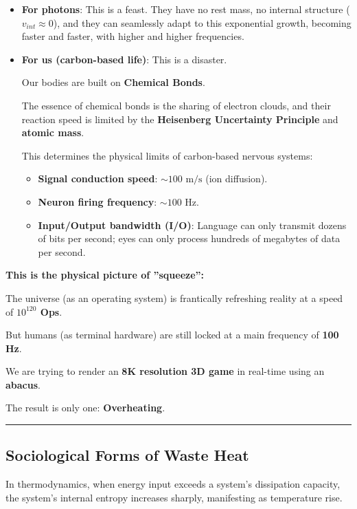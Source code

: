 \begin{itemize}
\item \textbf{For photons}: This is a feast. They have no rest mass, no internal structure ($v_{int} \approx 0$), and they can seamlessly adapt to this exponential growth, becoming faster and faster, with higher and higher frequencies.

\item \textbf{For us (carbon-based life)}: This is a disaster.

Our bodies are built on \textbf{Chemical Bonds}.

The essence of chemical bonds is the sharing of electron clouds, and their reaction speed is limited by the \textbf{Heisenberg Uncertainty Principle} and \textbf{atomic mass}.

This determines the physical limits of carbon-based nervous systems:

\begin{itemize}
\item \textbf{Signal conduction speed}: $\sim 100 \text{ m/s}$ (ion diffusion).

\item \textbf{Neuron firing frequency}: $\sim 100 \text{ Hz}$.

\item \textbf{Input/Output bandwidth (I/O)}: Language can only transmit dozens of bits per second; eyes can only process hundreds of megabytes of data per second.
\end{itemize}
\end{itemize}

\textbf{This is the physical picture of ''squeeze'':}

The universe (as an operating system) is frantically refreshing reality at a speed of \textbf{$10^{120}$ Ops}.

But humans (as terminal hardware) are still locked at a main frequency of \textbf{100 Hz}.

We are trying to render an \textbf{8K resolution 3D game} in real-time using an \textbf{abacus}.

The result is only one: \textbf{Overheating}.

\hrule

\subsection{Sociological Forms of Waste Heat}

In thermodynamics, when energy input exceeds a system's dissipation capacity, the system's internal entropy increases sharply, manifesting as temperature rise.

